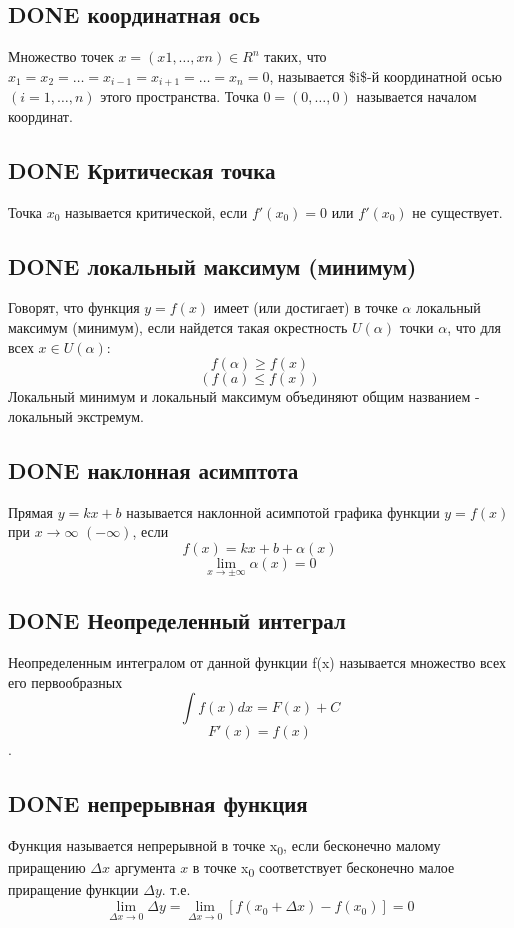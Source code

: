 \documentclass[11pt]{article}
\begin{document}
\subsection{{\bfseries\sffamily DONE} координатная ось}
\label{sec:org3151199}
Множество точек \(x=(x1,…,xn)\in R^n\) таких, что \(x_1=x_2=…=x_{i−1}=x_{i+1}=…=x_{n}=0\), называется \$i\$-й координатной осью \((i=1,…,n)\) этого пространства. Точка \(0=(0,…,0)\) называется началом координат.
\subsection{{\bfseries\sffamily DONE} Критическая точка}
\label{sec:org875988c}
Точка \(x_0\) называется критической, если \(f'(x_0)=0\) или \(f'(x_0)\) не существует.
\subsection{{\bfseries\sffamily DONE} локальный максимум (минимум)}
\label{sec:org69058f9}
Говорят, что функция \(y=f(x)\) имеет (или достигает) в точке \(\alpha\) локальный максимум (минимум), если найдется такая окрестность \(U(\alpha)\) точки \(\alpha\), что для всех \(x\in U(\alpha)\):
$$f(\alpha)\geq f(x)$$ 
$$(f(a)\leq f(x))$$
Локальный минимум и локальный максимум объединяют общим названием - локальный экстремум.
\subsection{{\bfseries\sffamily DONE} наклонная асимптота}
\label{sec:org9640ffb}
Прямая \(y=kx+b\) называется наклонной асимпотой графика функции \(y=f(x)\) при \(x\to \infty\) \((-\infty)\), если
$$f(x)=kx+b+\alpha(x)$$
$$\lim\limits_{x\to\pm\infty}\alpha(x)=0$$
\subsection{{\bfseries\sffamily DONE} Неопределенный интеграл}
\label{sec:org7e33b2d}
Неопределенным интегралом от данной функции f(x) называется множество всех его первообразных
$$\int f(x)dx=F(x)+C$$
$$F'(x)=f(x)$$.
\subsection{{\bfseries\sffamily DONE} непрерывная функция}
\label{sec:org21ba8f4}
Функция называется непрерывной в точке x\textsubscript{0}, если бесконечно малому приращению \(\Delta x\) аргумента \(x\) в точке x\textsubscript{0} соответствует бесконечно малое приращение функции \(\Delta y\). т.е.
$$\lim\limits_{\Delta x\to 0}\Delta y=\lim\limits_{\Delta x\to 0}[f(x_0+\Delta x)−f(x_0)]=0$$
\end{document}
